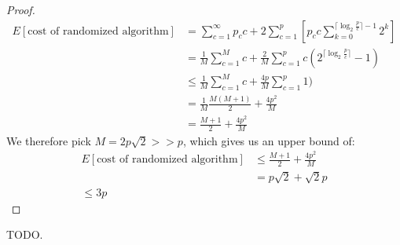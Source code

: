 \documentclass[12pt]{exam}
\begin{document}
\begin{questions}
\begin{solution}
\begin{enumerate}[label=(\alph*)]
\begin{proof}
\begin{align*}
        E[\text{cost of randomized algorithm}] &= \sum_{c=1}^{\infty} p_c c + 2\sum_{c=1}^{p} \left[ p_c c \sum_{k=0}^{\lceil \log_2 \frac{p}{c} \rceil - 1} 2^k \right] \\
        &= \frac{1}{M} \sum_{c=1}^{M} c + \frac{2}{M} \sum_{c=1}^p c (2^{\lceil \log_2 \frac{p}{c} \rceil} - 1) \\
        &\leq \frac{1}{M} \sum_{c=1}^{M} c + \frac{4p}{M} \sum_{c=1}^p 1) \\ 
        &= \frac{1}{M}\frac{M(M+1)}{2} + \frac{4p^2}{M} \\
        &= \frac{M+1}{2} + \frac{4p^2}{M}
      \end{align*}
      We therefore pick $M = 2 p \sqrt{2} >> p$, which gives us an upper bound of:
      \begin{align*}
         E[\text{cost of randomized algorithm}] &\leq \frac{M+1}{2} + \frac{4p^2}{M} \\
         &=p\sqrt{2} + \sqrt{2}p \\
         \leq 3p
      \end{align*}
    \end{proof}
    TODO.
  \end{enumerate}
\end{solution}

\end{questions}
\end{document}
